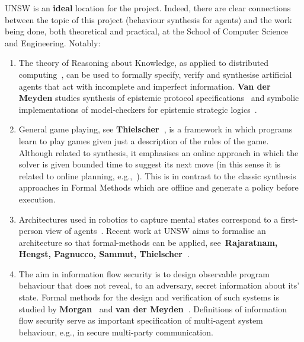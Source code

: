 \documentclass[a4paper,12pt]{scrartcl}
\renewcommand{\todo}[1]{}
\begin{document}

\todo{Morri: 1. What qualities at UNSW make it an ideal location for the project? 2. What support is on offer from school/faculty?}

UNSW is an \textbf{ideal} location for the project. Indeed, there are clear connections between the topic of this project (behaviour synthesis for agents) and the work being done, both theoretical and practical, at the School of Computer Science and Engineering. Notably:
\begin{enumerate}
\item The theory of Reasoning about Knowledge, as applied to distributed computing~\cite{FHMV95}, can be used to formally specify, verify and synthesise artificial agents 
that act with incomplete and imperfect information. \textbf{Van der Meyden} studies synthesis of epistemic protocol specifications~\cite{DBLP:conf/concur/MeydenV98,DBLP:journals/corr/HuangM16} and symbolic implementations of model-checkers for epistemic strategic logics~\cite{DBLP:conf/aaai/HuangM14}.

 \item General game playing, see \textbf{Thielscher~\cite{GGP}}, is a framework in which programs learn to play games given just a description of the rules of the game. Although related to synthesis, it emphasises an online approach in which the solver is given bounded time to suggest its next move (in this sense it is related to online planning, e.g.,~\cite{GeffnerBo13}). This is in contrast to the classic synthesis approaches in Formal Methods which are offline and generate a policy before execution. 
 
 \item Architectures used in robotics to capture mental states  correspond to a first-person view of agents~\cite{reiter2001knowledge}. Recent work at UNSW aims to formalise an architecture so that formal-methods can be applied, see~\textbf{Rajaratnam, Hengst, Pagnucco, Sammut, Thielscher~\cite{Rajaratnam2016}}.
 
 \item The aim in information flow security is to design observable program behaviour that does not reveal, to an adversary, secret information about its' state. Formal methods for the design and verification of such systems is studied by \textbf{Morgan~\cite{McIver2011}} and \textbf{van der Meyden~\cite{DBLP:conf/sp/EggertMSW11,DBLP:journals/tcs/CassezMZ16}}.  
 Definitions of information flow security serve as important specification of multi-agent system behaviour, e.g., in secure multi-party communication. 


\end{enumerate}
\end{document}
